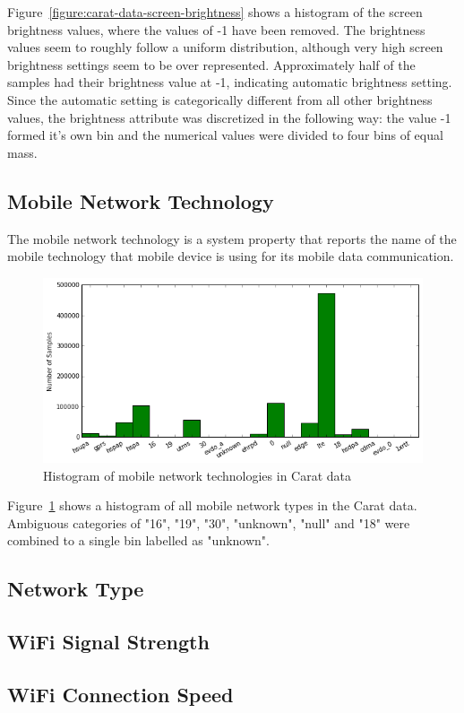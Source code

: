 Figure~\ref{figure:carat-data-screen-brightness} shows a histogram of the screen brightness values, where the values of -1 have been removed. The brightness values seem to roughly follow a uniform distribution, although very high screen brightness settings seem to be over represented. Approximately half of the samples had their brightness value at -1, indicating automatic brightness setting. Since the automatic setting is categorically different from all other brightness values, the brightness attribute was discretized in the following way: the value -1 formed it's own bin and the numerical values were divided to four bins of equal mass.   

\subsection{Mobile Network Technology}  

The mobile network technology is a system property that reports the name of the mobile technology that mobile device is using for its mobile data communication.

\begin{figure}[!htbp]
	\centering
	\includegraphics[width=\textwidth]{images/carat-data/mobile_net_type.png}
	\caption{Histogram of mobile network technologies in Carat data}
	\label{figure:carat-data-mobile-net-type}
\end{figure}   

Figure~\ref{figure:carat-data-mobile-net-type} shows a histogram of all mobile network types in the Carat data. Ambiguous categories of "16", "19", "30", "unknown", "null" and "18" were combined to a single bin labelled as "unknown".

\subsection{Network Type}  

\subsection{WiFi Signal Strength}

\subsection{WiFi Connection Speed}  